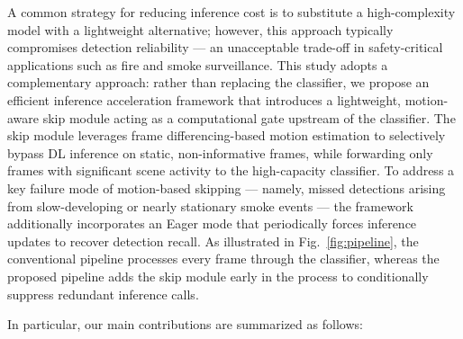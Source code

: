 \documentclass[final,3p,times,twocolumn]{elsarticle}
\begin{document}
A common strategy for reducing inference cost is to substitute a
high-complexity model with a lightweight alternative; however, this
approach typically compromises detection reliability --- an unacceptable
trade-off in safety-critical applications such as fire and smoke
surveillance. This study adopts a complementary approach: rather than
replacing the classifier, we propose an efficient inference acceleration
framework that introduces a lightweight, motion-aware skip module acting
as a computational gate upstream of the classifier. The skip module
leverages frame differencing-based motion estimation to selectively
bypass DL inference on static, non-informative frames, while forwarding
only frames with significant scene activity to the high-capacity
classifier. To address a key failure mode of motion-based skipping ---
namely, missed detections arising from slow-developing or nearly
stationary smoke events --- the framework additionally incorporates an
Eager mode that periodically forces inference updates to recover
detection recall. As illustrated in Fig.~\ref{fig:pipeline}, the
conventional pipeline processes every frame through the classifier,
whereas the proposed pipeline adds the skip module early in the process
to conditionally suppress redundant inference calls.

In particular, our main contributions are summarized as follows:
\end{document}
